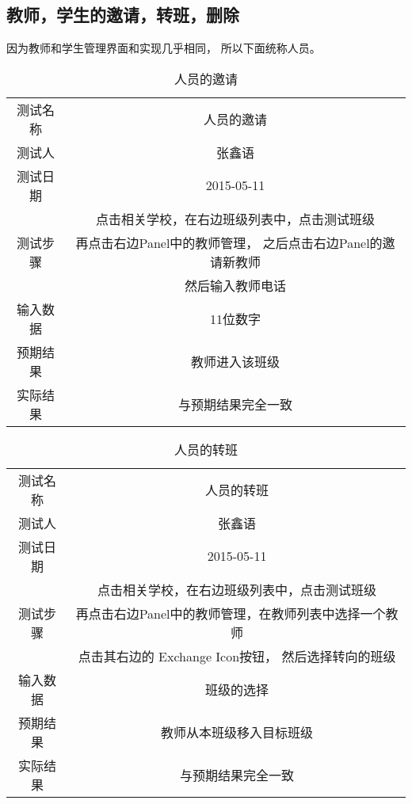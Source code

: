 \subsection{教师，学生的邀请，转班，删除}

因为教师和学生管理界面和实现几乎相同， 所以下面统称人员。


\begin{table}[H]
  \centering
  \caption{人员的邀请}
  \label{tab:7}
  \begin{tabular}{cc}
    \toprule
    测试名称 & 人员的邀请  \\

    测试人 & 张鑫语 \\
    测试日期 & 2015-05-11 \\

    \midrule
   \multirow{3}{*}{测试步骤} 		& 点击相关学校，在右边班级列表中，点击测试班级 \\
    & 再点击右边Panel中的教师管理， 之后点击右边Panel的邀请新教师 \\
      & 然后输入教师电话 \\
    \midrule
    输入数据 		& 11位数字 \\
    预期结果 		& 教师进入该班级 \\
    实际结果             & 与预期结果完全一致 \\
    \bottomrule
  \end{tabular}
\end{table}

\begin{table}[H]
  \centering
  \caption{人员的转班}
  \label{tab:8}
  \begin{tabular}{cc}
    \toprule
    测试名称 & 人员的转班  \\

    测试人 & 张鑫语 \\
    测试日期 & 2015-05-11 \\

    \midrule
    \multirow{3}{*}{测试步骤} 		& 点击相关学校，在右边班级列表中，点击测试班级 \\
             & 再点击右边Panel中的教师管理，在教师列表中选择一个教师\\
             &  点击其右边的 Exchange Icon按钮， 然后选择转向的班级 \\

    \midrule
    输入数据 		& 班级的选择 \\
    预期结果 		& 教师从本班级移入目标班级 \\
    实际结果             & 与预期结果完全一致 \\
    \bottomrule
  \end{tabular}
\end{table}



